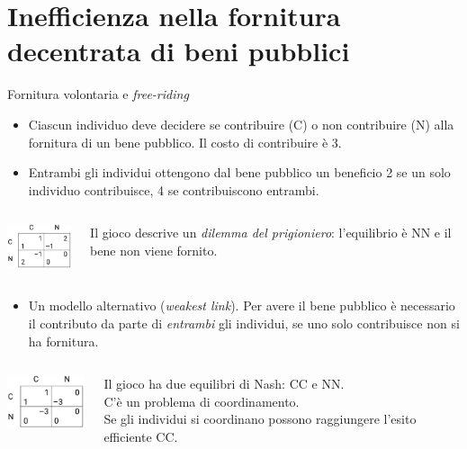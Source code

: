 \documentclass[aspectratio=64,12pt]{beamer}
\begin{document}
\section{Inefficienza nella fornitura decentrata di beni pubblici}

\begin{frame}{Fornitura volontaria e \emph{free-riding}}
\begin{itemize}
\item Ciascun individuo deve decidere se contribuire (C) o non contribuire (N) alla fornitura di un bene pubblico. Il costo di contribuire è 3.
\item Entrambi gli individui ottengono dal bene pubblico un beneficio 2 se un solo individuo contribuisce, 4 se contribuiscono entrambi. 
\end{itemize}
\vspace{-6pt}
\begin{columns}
\begin{column}{.4\columnwidth}
\begin{center}
\includegraphics[width=2.5cm]{./figure/gioco-bene-pubblico-dilemma-prigioniero.png}
\end{center}
\vspace{0pt}
\end{column}
\begin{column}{.6\columnwidth}
  Il gioco descrive un \emph{dilemma del prigioniero}: l'equilibrio è NN e il bene non viene fornito.
\end{column}
\end{columns}
\begin{itemize}
\item Un modello alternativo (\emph{weakest link}).  Per avere il bene pubblico è necessario il contributo da parte di \emph{entrambi} gli individui, se uno solo contribuisce non si ha fornitura.
\end{itemize}
\vspace{-6pt}
\begin{columns}
\begin{column}{.4\columnwidth}
\begin{center}
\includegraphics[width=2.5cm]{./figure/gioco-bene-pubblico-coordinamento.png}
\end{center}
\smallskip
\end{column}
\begin{column}{.6\columnwidth}
  Il gioco ha due equilibri di Nash: CC e NN.\\[0pt]
  C'è un problema di coordinamento.\\[0pt]
  Se gli individui si coordinano possono raggiungere l'esito efficiente CC.
\end{column}
\end{columns}
\end{frame}
\end{document}
